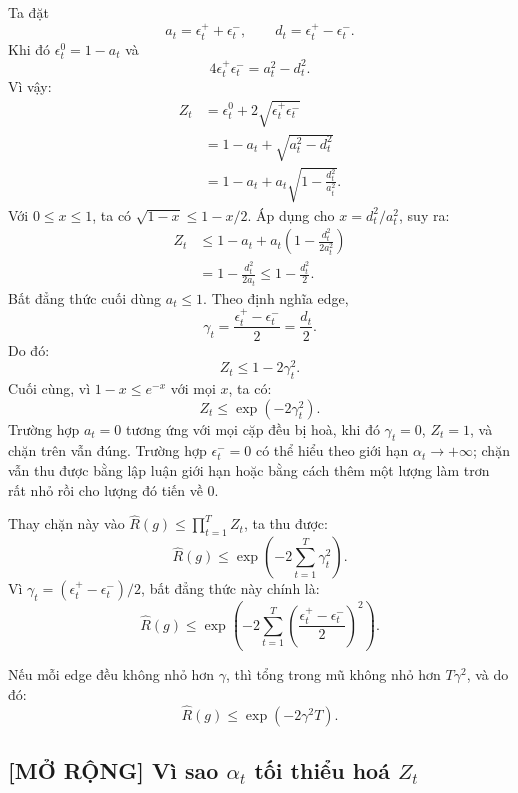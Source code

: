 Ta đặt
\[
    a_t=\epsilon_t^{+}+\epsilon_t^{-},
    \qquad
    d_t=\epsilon_t^{+}-\epsilon_t^{-}.
\]
Khi đó \(\epsilon_t^0=1-a_t\) và
\[
    4\epsilon_t^{+}\epsilon_t^{-}
    =
    a_t^2-d_t^2.
\]
Vì vậy:
\[
\begin{aligned}
    Z_t
    &=
    \epsilon_t^{0}
    +
    2\sqrt{\epsilon_t^{+}\epsilon_t^{-}}\\
    &=
    1-a_t+\sqrt{a_t^2-d_t^2}\\
    &=
    1-a_t+a_t\sqrt{1-\frac{d_t^2}{a_t^2}}.
\end{aligned}
\]
Với \(0\leq x\leq 1\), ta có \(\sqrt{1-x}\leq 1-x/2\). Áp dụng cho \(x=d_t^2/a_t^2\), suy ra:
\[
\begin{aligned}
    Z_t
    &\leq
    1-a_t
    +
    a_t
    \left(
        1-\frac{d_t^2}{2a_t^2}
    \right)\\
    &=
    1-\frac{d_t^2}{2a_t}
    \leq
    1-\frac{d_t^2}{2}.
\end{aligned}
\]
Bất đẳng thức cuối dùng \(a_t\leq 1\). Theo định nghĩa edge,
\[
    \gamma_t
    =
    \frac{\epsilon_t^{+}-\epsilon_t^{-}}{2}
    =
    \frac{d_t}{2}.
\]
Do đó:
\[
    Z_t
    \leq
    1-2\gamma_t^2.
\]
Cuối cùng, vì \(1-x\leq e^{-x}\) với mọi \(x\), ta có:
\[
    Z_t
    \leq
    \exp
    \left(
        -2
        \gamma_t^2
    \right).
\]
Trường hợp \(a_t=0\) tương ứng với mọi cặp đều bị hoà, khi đó \(\gamma_t=0\), \(Z_t=1\), và chặn trên vẫn đúng. Trường hợp \(\epsilon_t^{-}=0\) có thể hiểu theo giới hạn \(\alpha_t\to+\infty\); chặn vẫn thu được bằng lập luận giới hạn hoặc bằng cách thêm một lượng làm trơn rất nhỏ rồi cho lượng đó tiến về \(0\).

Thay chặn này vào \(\widehat{R}(g)\leq\prod_{t=1}^{T}Z_t\), ta thu được:
\[
    \widehat{R}(g)
    \leq
    \exp
    \left(
        -2
        \sum_{t=1}^{T}
        \gamma_t^2
    \right).
\]
Vì \(\gamma_t=(\epsilon_t^{+}-\epsilon_t^{-})/2\), bất đẳng thức này chính là:
\[
    \widehat{R}(g)
    \leq
    \exp
    \left(
        -2
        \sum_{t=1}^{T}
        \left(
            \frac{\epsilon_t^{+}-\epsilon_t^{-}}{2}
        \right)^2
    \right).
\]

Nếu mỗi edge đều không nhỏ hơn \(\gamma\), thì tổng trong mũ không nhỏ hơn \(T\gamma^2\), và do đó:
\[
    \widehat{R}(g)
    \leq
    \exp(-2\gamma^2T).
\]

\subsection{[MỞ RỘNG] Vì sao \texorpdfstring{\(\alpha_t\)}{alpha t} tối thiểu hoá \texorpdfstring{\(Z_t\)}{Zt}}


